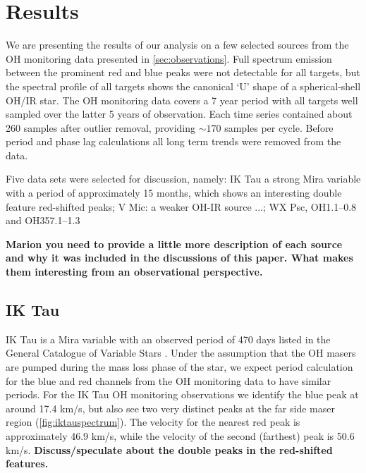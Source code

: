 \section{Results}
\label{sec:results}
We are presenting the results of our analysis on a few selected sources from the OH monitoring data presented in \cref{sec:observations}.
Full spectrum emission between the prominent red and blue peaks were not detectable for all targets, but the spectral profile of all targets shows the canonical `U' shape of a spherical-shell OH/IR star.
The OH monitoring data covers a 7 year period with all targets well sampled over the latter 5 years of observation.
Each time series contained about 260 samples after outlier removal, providing $\sim170$ samples per cycle.
Before period and phase lag calculations all long term trends were removed from the data.

{\color{red}
Five data sets were selected for discussion, namely:
IK Tau a strong Mira variable with a period of approximately 15 months, which shows an interesting double feature red-shifted peaks;
{\color{red}
V Mic: a weaker OH-IR source ...;
}
{\color{red}
WX Psc, OH1.1--0.8 and OH357.1--1.3 
}

\textbf{Marion you need to provide a little more description of each source and why it was included in the discussions of this paper.
What makes them interesting from an observational perspective.}
}


\subsection*{IK Tau}
IK Tau is a Mira variable with an observed period of 470 days listed in the General Catalogue of Variable Stars
\citep{2017ARep...61...80S}.
Under the assumption that the OH masers are pumped during the mass loss phase of the star, we expect period calculation for the blue and red channels from the OH monitoring data to have similar periods.
For the IK Tau OH monitoring observations we identify the blue peak at around 17.4 km/s, but also see two very distinct peaks at the far side maser region (\cref{fig:iktauspectrum}).
The velocity for the nearest red peak is approximately 46.9 km/s, while the velocity of the second (farthest) peak is 50.6 km/s.
{\color {red}
\textbf{Discuss/speculate about the double peaks in the red-shifted features.}
}

